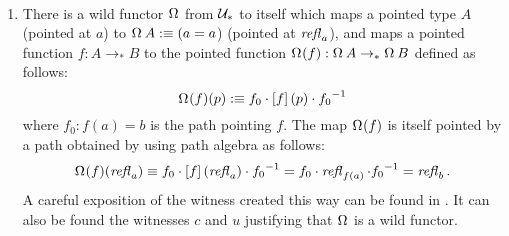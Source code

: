 \documentclass[english,a4]{article}
\def\githubpath{\tt\small}
\renewcommand{\ap}[1]{\left[{#1}\right]}
\newcommand{\ptdto}{\to_\ast}%
\newcommand{\UUptd}{\UU_{\ast}}
\begin{document}
\begin{example}~\label{ex:loop-sus-wild-functors}%
  \begin{enumerate}
    \item There is a wild functor $\loopspace \null$ from $\UUptd$ to itself
      which maps a pointed type $A$ (pointed at $a$) to $\loopspace \null A
      \defeq (a=a$) (pointed at $\mathop{{\mathit{refl}}_{a}}$), and maps a pointed function $f: A
      \ptdto B$ to the pointed function $\loopspace \null (f): \loopspace \null
      A \ptdto \loopspace \null B$ defined as follows:
      \begin{displaymath}
        \loopspace \null (f) (p) \defequi f_0 \cdot \ap f (p) \cdot \inv{f_0}
      \end{displaymath}
      where $f_0: f(a) = b$ is the path pointing $f$.
      The map $\loopspace \null (f)$ is itself pointed by a path obtained by
      using path algebra as follows:
      \begin{displaymath}
        \loopspace\null (f)(\refl a) \defequal  f_0 \cdot \ap f (\refl a) \cdot \inv{f_0}
        = f_0 \cdot \refl {f(a)} \cdot \inv{f_0}
        = \refl b.
      \end{displaymath}
      A careful exposition of the witness created this way can be found in
      \cite[\githubpath core/lib/types/LoopSpace.agda]{hott-agda}. It can also
      be found the witnesses $c$ and $u$ justifying that $\loopspace \null$ is
      a wild functor.

\end{enumerate}
\end{example}
\end{document}
